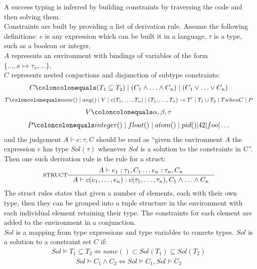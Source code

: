 \documentclass[12pt, titlepage]{article}
\begin{document}
A success typing is inferred by building constraints by traversing the code and then solving them. \\
Constraints are built by providing a list of derivation rule. Assume the following definitions:
$e$ is any expression which can be built it in a language,
$\tau$ is a type, such as a boolean or integer, \\
$A$ represents an environment with bindings of variables of the form $\{\ldots, x \mapsto \tau_x, \ldots\}$, \\
$C$ represents nested conjuctions and disjunction of subtype constraints:
\begin{align*} 
	C \coloncolonequals (T_1 \subseteq T_2) \mid (C_1 \land \ldots \land C_n) \mid (C_1 \lor \ldots \lor C_n)
\end{align*}
\begin{align*} 
	T \coloncolonequals none() \mid any() \mid V \mid c(T_1, \ldots, T_n) \mid (T_1, \ldots, T_n) \rightarrow T'\mid T_1 \cup T_2 \mid T when C \mid P
\end{align*}
\begin{align*} 
	V \coloncolonequals \alpha, \beta, \tau
\end{align*}
\begin{align*} 
	P \coloncolonequals integer() \mid float() \mid atom() \mid pid()| 42 | foo | \ldots
\end{align*}
and the judgement $A \vdash e : \tau, C$ should be read as ``given the environment $A$ the expression $e$ has type $Sol(\tau)$ whenever $Sol$ is a solution to the constraints in C''. \\
Then one such derivation rule is the rule for a struct:
                \[
\inference*[STRUCT]{  A \vdash  e_1 : \tau_1, C_1 \ldots e_n : \tau_n, C_n}
                                        {A \vdash  c(e_1, \ldots, e_n) : c(\tau_1, \ldots, \tau_n), C_1 \land \ldots \land C_n}
                \]
The struct rules states that given a number of elements, each with their own type, then they can be grouped into a tuple structure in the environment with each individual element retaining their type. The constraints for each element are added to the environment in a conjunction. \\
$Sol$ is a mapping from type expressions and type variables to conrete types. $Sol$ is a solution to a constraint set $C$ if:
\begin{align*} 
	Sol \models T_1 \subseteq T_2 \iff none() \subset Sol(T_1) \subseteq Sol(T_2)
\end{align*}
\begin{align*} 
	Sol \models C_1 \land C_2 \iff Sol \models C_1, Sol \models  C_2
\end{align*}
\end{document}
